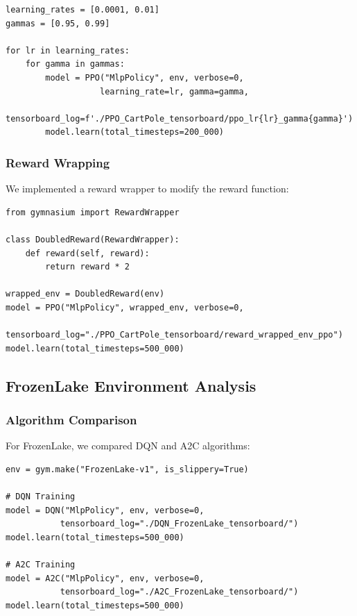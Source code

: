 \documentclass[12pt]{article}
\begin{document}
{{{\begin{verbatim}
learning_rates = [0.0001, 0.01]  
gammas = [0.95, 0.99]

for lr in learning_rates:
    for gamma in gammas:
        model = PPO("MlpPolicy", env, verbose=0,
                   learning_rate=lr, gamma=gamma,
                   tensorboard_log=f'./PPO_CartPole_tensorboard/ppo_lr{lr}_gamma{gamma}')
        model.learn(total_timesteps=200_000)
\end{verbatim}

\subsubsection{Reward Wrapping}

We implemented a reward wrapper to modify the reward function:

\begin{verbatim}
from gymnasium import RewardWrapper

class DoubledReward(RewardWrapper):
    def reward(self, reward):
        return reward * 2

wrapped_env = DoubledReward(env)
model = PPO("MlpPolicy", wrapped_env, verbose=0, 
           tensorboard_log="./PPO_CartPole_tensorboard/reward_wrapped_env_ppo")
model.learn(total_timesteps=500_000)
\end{verbatim}

\subsection{FrozenLake Environment Analysis}

\subsubsection{Algorithm Comparison}

For FrozenLake, we compared DQN and A2C algorithms:

\begin{verbatim}
env = gym.make("FrozenLake-v1", is_slippery=True)

# DQN Training
model = DQN("MlpPolicy", env, verbose=0, 
           tensorboard_log="./DQN_FrozenLake_tensorboard/")
model.learn(total_timesteps=500_000)

# A2C Training  
model = A2C("MlpPolicy", env, verbose=0, 
           tensorboard_log="./A2C_FrozenLake_tensorboard/")
model.learn(total_timesteps=500_000)
\end{verbatim}

}}}
\end{document}
